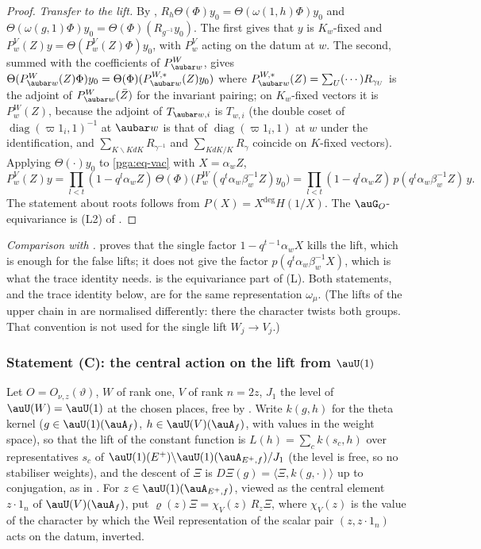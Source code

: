 \documentclass[10pt]{amsart}
\theoremstyle{definition}
\theoremstyle{remark}
\begin{document}
\begin{proof}
\emph{Transfer to the lift.} By {\cite[(5)]{P54}}, $R_h\Theta(\Phi)y_0=\Theta(\omega(1,h)\Phi)
y_0$ and $\Theta(\omega(g,1)\Phi)y_0=\Theta(\Phi)(R_{g^{-1}}y_0)$. The first gives that $y$ is
$K_w$-fixed and $P^V_w(Z)y=\Theta(P^V_w(Z)\Phi)y_0$, with $P^V_w$ acting on the datum at $w$. The
second, summed with the coefficients of $P^W_{\aubar w}$, gives $\Theta(P^W_{\aubar w}(Z)\Phi)y_0
=\Theta(\Phi)(P^{W,*}_{\aubar w}(Z)y_0)$ where $P^{W,*}_{\aubar w}(Z)=\sum_U(\cdots)R_{\gamma_U}$
is the adjoint of $P^W_{\aubar w}(\bar Z)$ for the invariant pairing; on $K_w$-fixed vectors it is
$P^W_w(Z)$, because the adjoint of $T_{\aubar w,i}$ is $T_{w,i}$ (the double coset of
$\operatorname{diag}(\varpi1_i,1)^{-1}$ at $\aubar w$ is that of $\operatorname{diag}(\varpi 1_i,
1)$ at $w$ under the identification, and $\sum_{K\backslash KdK}R_{\gamma^{-1}}$ and
$\sum_{KdK/K}R_{\gamma}$ coincide on $K$-fixed vectors). Applying $\Theta(\cdot)y_0$ to \eqref{pga:eq-vac} with
$X=\alpha_wZ$,
\[
P^V_w(Z)y=\prod_{l<t}(1-q^l\alpha_wZ)\,\Theta(\Phi)\bigl(P^W_w(q^t\alpha_w\beta_w^{-1}Z)y_0\bigr)
=\prod_{l<t}(1-q^l\alpha_wZ)\,p(q^t\alpha_w\beta_w^{-1}Z)\,y .
\]
The statement about roots follows from $P(X)=X^{\deg}H(1/X)$. The $\auG_O$-equivariance is
(L2) of {\cite[Lemma~2.2]{P54}}.
\end{proof}

\emph{Comparison with {\cite[Lemma~2.2]{P54}}.} {\cite[Lemma~2.2(L3)]{P54}} proves that the single
factor $1-q^{t-1}\alpha_wX$ kills the lift, which is enough for the false lifts; it does not give
the factor $p(q^t\alpha_w\beta_w^{-1}X)$, which is what the trace identity needs.
{\cite[Lemma~2.2(L2)]{P54}} is the equivariance part of (L). Both statements, and the trace identity
below, are for the same representation $\omega_\mu$. (The lifts of the upper chain in
{\cite[\S5.1.1]{P49}} are normalised differently: there the character twists both groups. That
convention is not used for the single lift $W_j\to V_j$.)

\subsubsection{Statement (C): the central action on the lift from $\auU(1)$}\label{pga:ss-C}

Let $O=O_{\nu,z}(\vartheta)$, $W$ of rank one, $V$ of rank $n=2z$, $J_1$ the level of $\auU(W)=
\auU(1)$ at the chosen places, free by {\cite[Lemma~14.5]{P46}}. Write $k(g,h)$ for the theta kernel
($g\in\auU(1)(\auA_f)$, $h\in\auU(V)(\auA_f)$, with values in the weight space), so that the lift
of the constant function is $L(h)=\sum_{c}k(s_c,h)$ over representatives $s_c$ of
$\auU(1)(E^+)\backslash\auU(1)(\auA_{E^+,f})/J_1$ (the level is free, so no stabiliser weights),
and the descent of $\Xi$ is $D\Xi(g)=\langle\Xi,k(g,\cdot)\rangle$ up to conjugation, as in
{\cite[(6)]{P54}}. For $z\in\auU(1)(\auA_{E^+,f})$, viewed as the central element $z\cdot1_n$
of $\auU(V)(\auA_f)$, put $\varrho(z)\Xi=\chi_V(z)\,R_z\Xi$, where $\chi_V(z)$ is the value of the
character by which the Weil representation of the scalar pair $(z,z\cdot1_n)$ acts on the datum,
inverted.
\end{document}
